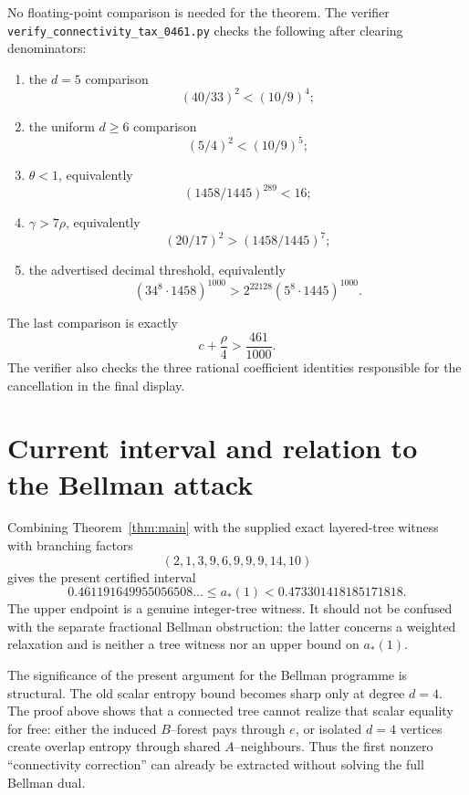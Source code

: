\documentclass[11pt]{article}
\begin{document}
No floating-point comparison is needed for the theorem.  The verifier
\texttt{verify\_connectivity\_tax\_0461.py} checks the following after clearing denominators:
\begin{enumerate}
 \item the $d=5$ comparison
 \[
 (40/33)^2<(10/9)^4;
 \]
 \item the uniform $d\ge6$ comparison
 \[
 (5/4)^2<(10/9)^5;
 \]
 \item $\theta<1$, equivalently
 \[
 (1458/1445)^{289}<16;
 \]
 \item $\gamma>7\rho$, equivalently
 \[
 (20/17)^2>(1458/1445)^7;
 \]
 \item the advertised decimal threshold, equivalently
 \[
 \left(34^8\cdot1458\right)^{1000}
 >2^{22128}\left(5^8\cdot1445\right)^{1000}.
 \]
\end{enumerate}
The last comparison is exactly
\[
 c+\frac{\rho}{4}>\frac{461}{1000}.
\]
The verifier also checks the three rational coefficient identities responsible for the cancellation in the final display.

\section{Current interval and relation to the Bellman attack}

Combining Theorem~\ref{thm:main} with the supplied exact layered-tree witness with branching factors
\[
 (2,1,3,9,6,9,9,9,14,10)
\]
gives the present certified interval
\[
 \boxed{
 0.461191649955056508\ldots
 \le a_*(1)
 <0.473301418185171818.
 }
\]
The upper endpoint is a genuine integer-tree witness.  It should not be confused with the separate fractional Bellman obstruction: the latter concerns a weighted relaxation and is neither a tree witness nor an upper bound on $a_*(1)$.

The significance of the present argument for the Bellman programme is structural.  The old scalar entropy bound becomes sharp only at degree $d=4$.  The proof above shows that a connected tree cannot realize that scalar equality for free: either the induced $B$--forest pays through $e$, or isolated $d=4$ vertices create overlap entropy through shared $A$--neighbours.  Thus the first nonzero ``connectivity correction'' can already be extracted without solving the full Bellman dual.
\end{document}
